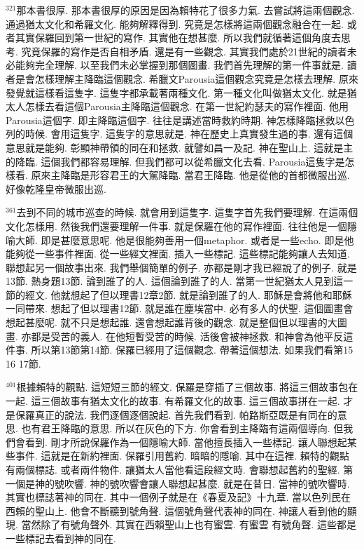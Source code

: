 \documentclass{book}
\begin{document}
$^{321}$那本書很厚.
那本書很厚的原因是因為賴特花了很多力氣.
去嘗試將這兩個觀念.
通過猶太文化和希羅文化.
能夠解釋得到.
究竟是怎樣將這兩個觀念融合在一起.
或者其實保羅回到第一世紀的寫作.
其實他在想甚麼.
所以我們就循著這個角度去思考.
究竟保羅的寫作是否自相矛盾.
還是有一些觀念.
其實我們處於21世紀的讀者未必能夠完全理解.
以至我們未必掌握到那個圖畫.
我們首先理解的第一件事就是.
讀者是會怎樣理解主降臨這個觀念.
希臘文Parousia這個觀念究竟是怎樣去理解.
原來發覺就這樣看這隻字.
這隻字都承載著兩種文化.
第一種文化叫做猶太文化.
就是猶太人怎樣去看這個Parousia主降臨這個觀念.
在第一世紀約瑟夫的寫作裡面.
他用Parousia這個字.
即主降臨這個字.
往往是講述當時救約時期.
神怎樣降臨拯救以色列的時候.
會用這隻字.
這隻字的意思就是.
神在歷史上真實發生過的事.
還有這個意思就是能夠.
彰顯神帶領的同在和拯救.
就譬如昌一及記.
神在聖山上.
這就是主的降臨.
這個我們都容易理解.
但我們都可以從希臘文化去看.
Parousia這隻字是怎樣看.
原來主降臨是形容君王的大駕降臨.
當君王降臨.
他是從他的首都微服出巡.
好像乾隆皇帝微服出巡.

$^{361}$去到不同的城市巡查的時候.
就會用到這隻字.
這隻字首先我們要理解.
在這兩個文化怎樣用.
然後我們還要理解一件事.
就是保羅在他的寫作裡面.
往往他是一個隱喻大師.
即是甚麼意思呢.
他是很能夠善用一個metaphor.
或者是一些echo.
即是他能夠從一些事件裡面.
從一些經文裡面.
插入一些標記.
這些標記能夠讓人去知道.
聯想起另一個故事出來.
我們舉個簡單的例子.
亦都是剛才我已經說了的例子.
就是13節.
熱身題13節.
論到誰了的人.
這個論到誰了的人.
當第一世紀猶太人見到這一節的經文.
他就想起了但以理書12章2節.
就是論到誰了的人.
耶穌是會將他和耶穌一同帶來.
想起了但以理書12節.
就是誰在塵埃當中.
必有多人的伏聖.
這個圖畫會想起甚麼呢.
就不只是想起誰.
還會想起誰背後的觀念.
就是整個但以理書的大圖畫.
亦都是受苦的義人.
在他短暫受苦的時候.
活後會被神拯救.
和神會為他平反這件事.
所以第13節第14節.
保羅已經用了這個觀念.
帶著這個想法.
如果我們看第15 16 17節.

$^{401}$根據賴特的觀點.
這短短三節的經文.
保羅是穿插了三個故事.
將這三個故事包在一起.
這三個故事有猶太文化的故事.
有希羅文化的故事.
這三個故事拼在一起.
才是保羅真正的說法.
我們逐個逐個說起.
首先我們看到.
帕路斯亞既是有同在的意思.
也有君王降臨的意思.
所以在灰色的下方.
你會看到主降臨有這兩個導向.
但我們會看到.
剛才所說保羅作為一個隱喻大師.
當他擅長插入一些標記.
讓人聯想起某些事件.
這就是在新約裡面.
保羅引用舊約.
暗暗的隱喻.
其中在這裡.
賴特的觀點有兩個標誌.
或者兩件物件.
讓猶太人當他看這段經文時.
會聯想起舊約的聖經.
第一個是神的號吹響.
神的號吹響會讓人聯想起甚麼.
就是在昔日.
當神的號吹響時.
其實也標誌著神的同在.
其中一個例子就是在《春夏及記》十九章.
當以色列民在西賴的聖山上.
他會不斷聽到號角聲.
這個號角聲代表神的同在.
神讓人看到他的顯現.
當然除了有號角聲外.
其實在西賴聖山上也有蜜雲.
有蜜雲 有號角聲.
這些都是一些標記去看到神的同在.
\end{document}
